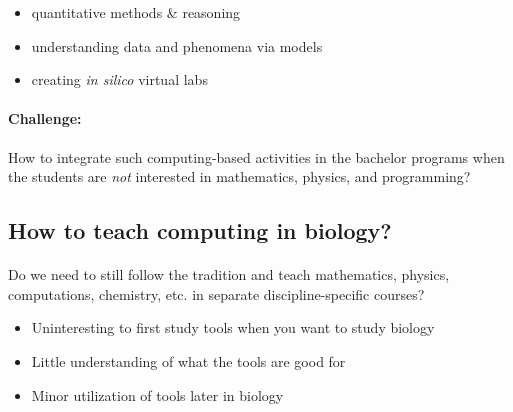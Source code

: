 \documentclass[%
twoside,                 %
final,                   %
10pt]{article}
\begin{document}
\begin{itemize}
  \item quantitative methods {\&} reasoning

  \item understanding data and phenomena via models

  \item creating \emph{in silico} virtual labs
\end{itemize}

\noindent




\paragraph{Challenge:}
How to integrate such computing-based activities in the bachelor programs
when the students are \emph{not} interested in mathematics, physics, and
programming?



\subsection*{How to teach computing in biology?}


\paragraph{}
Do we need to still follow the tradition and teach mathematics, physics, computations, chemistry, etc. in separate discipline-specific courses?

\begin{itemize}
  \item Uninteresting to first study tools when you want to study biology

  \item Little understanding of what the tools are good for

  \item Minor utilization of tools later in biology
\end{itemize}

\noindent




\end{document}
